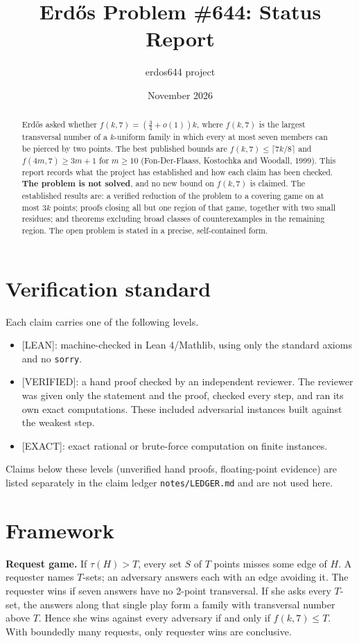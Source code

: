 \documentclass[11pt]{article}
\title{Erd\H{o}s Problem \#644: Status Report}
\author{erdos644 project}
\date{November 2026}
\newcommand{\lvl}[1]{\textsf{\small[#1]}}
\begin{document}
\maketitle

\begin{abstract}
Erd\H{o}s asked whether $f(k,7)=(\tfrac34+o(1))k$, where $f(k,7)$ is the largest transversal number of a
$k$-uniform family in which every at most seven members can be pierced by two points. The best published bounds are
$f(k,7)\le\lceil 7k/8\rceil$ and $f(4m,7)\ge 3m+1$ for $m\ge 10$ (Fon-Der-Flaass, Kostochka and Woodall, 1999).
This report records what the project has established and how each claim has been checked.
\textbf{The problem is not solved}, and no new bound on $f(k,7)$ is claimed. The established results are: a verified
reduction of the problem to a covering game on at most $3k$ points; proofs closing all but one region of that game,
together with two small residues; and theorems excluding broad classes of counterexamples in the remaining region.
The open problem is stated in a precise, self-contained form.
\end{abstract}

\section{Verification standard}
Each claim carries one of the following levels.
\begin{itemize}
\item \lvl{LEAN}: machine-checked in Lean 4/Mathlib, using only the standard axioms and no \texttt{sorry}.
\item \lvl{VERIFIED}: a hand proof checked by an independent reviewer. The reviewer was given only the statement and
the proof, checked every step, and ran its own exact computations. These included adversarial instances built
against the weakest step.
\item \lvl{EXACT}: exact rational or brute-force computation on finite instances.
\end{itemize}
Claims below these levels (unverified hand proofs, floating-point evidence) are listed separately in the claim ledger
\texttt{notes/LEDGER.md} and are not used here.

\section{Framework}
\textbf{Request game.} If $\tau(H)>T$, every set $S$ of $T$ points misses some edge of $H$. A requester names $T$-sets;
an adversary answers each with an edge avoiding it. The requester wins if seven answers have no 2-point transversal.
If she asks every $T$-set, the answers along that single play form a family with transversal number above $T$.
Hence she wins against every adversary if and only if $f(k,7)\le T$. With boundedly many requests, only requester wins
are conclusive.
\end{document}
